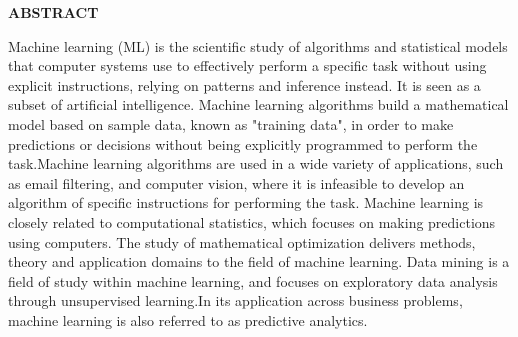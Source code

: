 \documentclass[12pt,times,a4paper]{report}
\renewcommand{\baselinestretch}{1.5}
\begin{document}






\newpage













\newpage
\renewcommand{\baselinestretch}{1.5}

\begin{center}
{\fontsize{14}{12} \bf ABSTRACT}\\

\begin{enumerate}
\begin{normalsize}
\vspace{0.4in}
		 Machine learning (ML) is the scientific study of algorithms and statistical models that computer systems use to effectively perform a specific task without using explicit instructions, relying on patterns and inference instead. It is seen as a subset of artificial intelligence. Machine learning algorithms build a mathematical model based on sample data, known as "training data", in order to make predictions or decisions without being explicitly programmed to perform the task.Machine learning algorithms are used in a wide variety of applications, such as email filtering, and computer vision, where it is infeasible to develop an algorithm of specific instructions for performing the task. Machine learning is closely related to computational statistics, which focuses on making predictions using computers. The study of mathematical optimization delivers methods, theory and application domains to the field of machine learning. Data mining is a field of study within machine learning, and focuses on exploratory data analysis through unsupervised learning.In its application across business problems, machine learning is also referred to as predictive analytics.
\\

\end{normalsize}
\end{enumerate}
\end{center}
\end{document}
